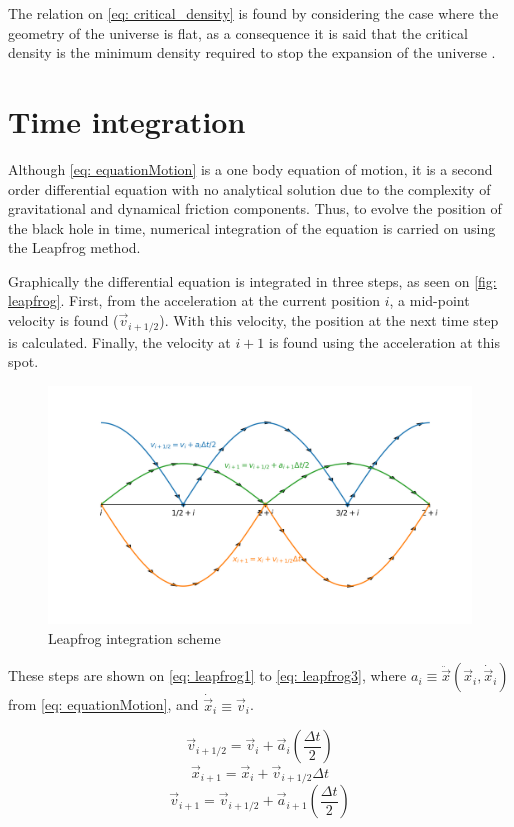 	The relation on \autoref{eq: critical_density} is found by considering the case where the geometry of the universe is flat, as a consequence it is said that the critical density is the minimum density required to stop the expansion of the universe \cite{binney2011galactic}.
	
\chapter{Time integration}
	Although \autoref{eq: equationMotion} is a one body equation of motion, it is a second order differential equation with no analytical solution due to the complexity of gravitational and dynamical friction components. Thus, to evolve the position of the black hole in time, numerical integration of the equation is carried on using the Leapfrog method.
	
	Graphically the differential equation is integrated in three steps, as seen on \autoref{fig: leapfrog}. First, from the acceleration at the current position $i$, a mid-point velocity is found ($\vec{v}_{i + 1/2}$). With this velocity, the position at the next time step is calculated. Finally, the velocity at $i + 1$ is found using the acceleration at this spot.	
	\begin{figure}[h]
		\centering
		\includegraphics[width = 0.8\linewidth]{"../Files/Week 13/leapfrog"}
		\caption{Leapfrog integration scheme}
		\label{fig: leapfrog}
	\end{figure}

	These steps are shown on \autoref{eq: leapfrog1} to \autoref{eq: leapfrog3}, where $a_i \equiv \ddot{\vec{x}}(\vec{x}_i, \dot{\vec{x}}_i)$ from \autoref{eq: equationMotion}, and $\dot{\vec{x}}_i \equiv \vec{v}_i$.
	
	\begin{equation}\label{eq: leapfrog1}
		\vec{v}_{i+1/2} = \vec{v}_i + \vec{a}_i\left(\dfrac{\Delta t}{2}\right)
	\end{equation}
	\begin{equation}
		\vec{x}_{i+1} = \vec{x}_i + \vec{v}_{i+1/2}\Delta t
	\end{equation}
	\begin{equation}\label{eq: leapfrog3}
		\vec{v}_{i+1} = \vec{v}_{i+1/2}+\vec{a}_{i+1}\left(\dfrac{\Delta t}{2}\right)
	\end{equation}
	
